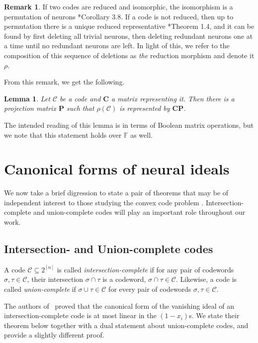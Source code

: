 \documentclass[11pt,letterpaper, reqno]{amsart}
\newtheorem{lem}[thm]{Lemma}         %
\theoremstyle{definition}
\newtheorem{rmk}[thm]{Remark}
\def\F{\mathbb{F}}
\def\bC{\mathbf{C}}
\def\bP{\mathbf{P}}
\def\cC{\mathcal{C}}
\begin{document}
        \begin{rmk}\label{rmk:reductionmorphism}
            If two codes are reduced and isomorphic, the isomorphism is a permutation of neurons \cite{morphisms}*{Corollary 3.8}. 
            If a code is not reduced, then up to permutation there is a unique reduced representative \cite{morphisms}*{Theorem 1.4}, and it can be found by first deleting all trivial neurons, then deleting redundant neurons one at a time until no redundant neurons are left.
            In light of this, we refer to the composition of this sequence of deletions as \emph{the} reduction morphism and denote it $\rho$.
        \end{rmk}
        From this remark, we get the following.
        \begin{lem}\label{lem:rhoisprojection}
            Let $\cC$ be a code and $\bC$ a matrix representing it. Then there is a projection matrix $\bP$ such that $\rho(\cC)$ is represented by $\bC\bP$.
        \end{lem}
        \noindent The intended reading of this lemma is in terms of Boolean matrix operations, but we note that this statement holds over $\F$ as well.

\section{Canonical forms of neural ideals}\label{sec:canonicalforms}

    We now take a brief digression to state a pair of theorems that may be of independent interest to those studying the convex code problem \cites{curto2017whatconvex,curto2019algebraic}.
    Intersection-complete and union-complete codes will play an important role throughout our work.

\subsection{Intersection- and Union-complete codes}
    A code $\cC \subseteq 2^{[n]}$ is called \emph{intersection-complete} if for any pair of codewords $\sigma, \tau \in \cC$, their intersection $\sigma\cap\tau$ is a codeword, $\sigma\cap\tau \in \cC$.
Likewise, a code is called \emph{union-complete} if $\sigma\cup\tau \in\cC$ for every pair of codewords $\sigma,\tau \in \cC$.

    The authors of~\cite{curto2019algebraic} proved that the canonical form of the vanishing ideal of an intersection-complete code is at most linear in the $(1-x_i)$s. We state their theorem below together with a dual statement about union-complete codes, and provide a slightly different proof.
\end{document}
